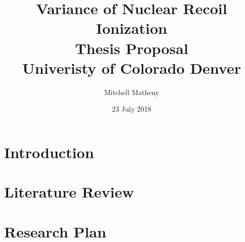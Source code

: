 \documentclass[12pt]{report}
\title{
	{Variance of Nuclear Recoil Ionization}\\
	{\large Thesis Proposal}\\
	{\large Univeristy of Colorado Denver}\\
	}
\author{Mitchell Matheny}
\date{23 July 2018}
\begin{document}
\maketitle	

\tableofcontents

\chapter{Introduction}



\chapter{Literature Review}


\chapter{Research Plan}

	




	
	
	
\end{document}
